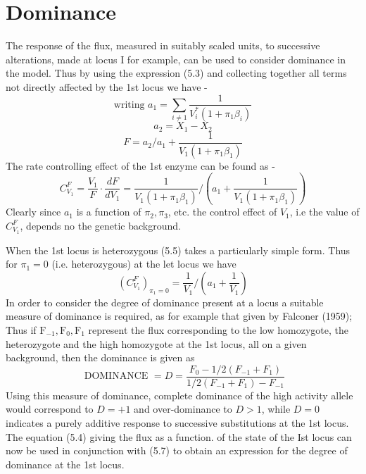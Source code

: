 \section{Dominance}

The response of the flux, measured in suitably scaled units, to successive alterations, made at locus I for example, can be used to consider dominance in the model. Thus by using the expression (5.3) and collecting together all terms not directly affected by the 1st locus we have -
%
$$\mbox{writing } a_{1}=\sum_{i \neq 1} \frac{1}{V_{i}^{*}\left(1+\pi_{1} \beta_{i}\right)} $$
%
$$ a_{2}=X_{1}-X_{2} $$
%
\begin{equation}
F = a_{2} / a_{1}+\frac{1}{V_{1}\left(1+\pi_{1} \beta_{1}\right)}
\label{eqn:504}
\end{equation}
%
The rate controlling effect of the 1st enzyme can be found as -
%
\begin{equation}
C_{V_{1}}^{F}=\frac{V_{1}}{F} \cdot \frac{d F}{d V_{1}} = \frac{1}{V_{1}\left(1+\pi_{1} \beta_{1}\right)} /\left(a_{1}+\frac{1}{V_{1}\left(1+\pi_{1} \beta_{1}\right)}\right)
\label{eqn:505}
\end{equation}
%
Clearly since $a_{1}$ is a function of $\pi_{2}, \pi_{3}$, etc. the control effect of $V_{1}$, i.e the value of $C^F_{V_1}$, depends no the genetic background.

When the 1st locus is heterozygous (5.5) takes a particularly simple form. Thus for $\pi_{1}=0$ (i.e. heterozygous) at the let locus we have
%
\begin{equation}
\left(C_{V_{1}}^{F}\right)_{\pi_{1}=0}=\frac{1}{V_{1}} \big/\left(a_{1}+\frac{1}{V_{1}}\right)
\label{eqn:506}
\end{equation}
%
In order to consider the degree of dominance present at a locus a suitable measure of dominance is required, as for example that given by Falconer (1959); Thus if $\mathrm{F}_{-1}, \mathrm{F}_{0}, \mathrm{F}_{1}$ represent the flux corresponding to the low homozygote, the heterozygote and the high homozygote at the 1st locus, all on a given background, then the dominance is given as
%
\begin{equation}
\text { DOMINANCE }=D=\frac{F_{0}-1 / 2\left(F_{-1}+F_{1}\right)}{1 / 2\left(F_{-1}+F_{1}\right)-F_{-1}}
\label{eqn:507}
\end{equation}
%
Using this measure of dominance, complete dominance of the high activity allele would correspond to $D=+1$ and over-dominance to $D>1$, while $D=0$ indicates a purely additive response to successive substitutions at the 1st locus. The equation (5.4) giving the flux as a function. of the state of the Ist locus can now be used in conjunction with (5.7) to obtain an expression for the degree of dominance at the 1st locus.

